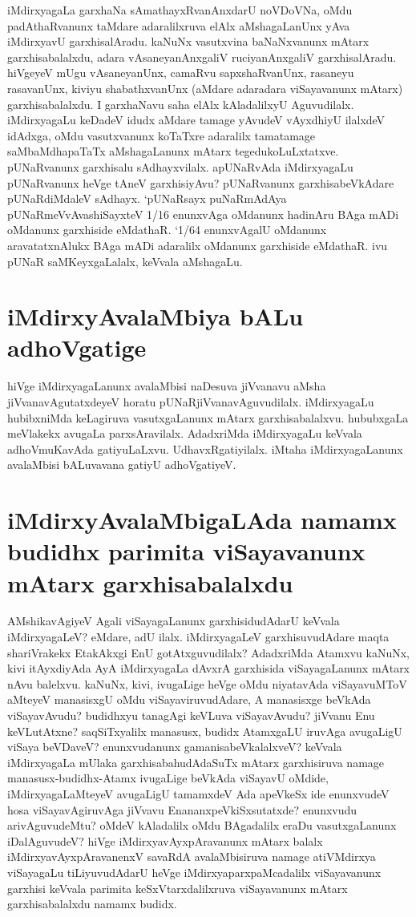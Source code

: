 iMdirxyagaLa garxhaNa sAmathayxRvanAnxdarU noVDoVNa, oMdu padAthaRvanunx taMdare adaralilxruva elAlx aMshagaLanUnx yAva iMdirxyavU garxhisalAradu. kaNuNx vasutxvina baNaNxvanunx mAtarx garxhisabalalxdu, adara vAsaneyanAnxgaliV ruciyanAnxgaliV garxhisalAradu. hiVgeyeV mUgu vAsaneyanUnx, camaRvu sapxshaRvanUnx, rasaneyu rasavanUnx, kiviyu shabathxvanUnx (aMdare adaradara viSayavanunx mAtarx) garxhisabalalxdu. I garxhaNavu saha elAlx kAladalilxyU Aguvudilalx. iMdirxyagaLu keDadeV idudx aMdare tamage yAvudeV vAyxdhiyU ilalxdeV idAdxga, oMdu vasutxvanunx koTaTxre adaralilx tamatamage saMbaMdhapaTaTx aMshagaLanunx mAtarx tegedukoLuLxtatxve. pUNaRvanunx garxhisalu sAdhayxvilalx. apUNaRvAda iMdirxyagaLu pUNaRvanunx heVge tAneV garxhisiyAvu? pUNaRvanunx garxhisabeVkAdare pUNaRdiMdaleV sAdhayx. `pUNaRsayx puNaRmAdAya\label{268} pUNaRmeVvAvashiSayxteV 1/16 enunxvAga oMdanunx hadinAru BAga mADi oMdanunx garxhiside eMdathaR. `1/64 enunxvAgalU oMdanunx aravatatxnAlukx BAga mADi adaralilx oMdanunx garxhiside eMdathaR. ivu pUNaR saMKeyxgaLalalx, keVvala aMshagaLu.

\section*{iMdirxyAvalaMbiya bALu adhoVgatige}

hiVge iMdirxyagaLanunx avalaMbisi naDesuva jiVvanavu aMsha jiVvanavAgutatxdeyeV horatu pUNaRjiVvanavAguvudilalx. iMdirxyagaLu hubibxniMda keLagiruva vasutxgaLanunx mAtarx garxhisabalalxvu. hububxgaLa meVlakekx avugaLa parxsAravilalx. AdadxriMda iMdirxyagaLu keVvala adhoVmuKavAda gatiyuLaLxvu. UdhavxRgatiyilalx. iMtaha iMdirxyagaLanunx avalaMbisi bALuvavana gatiyU adhoVgatiyeV.

\section*{iMdirxyAvalaMbigaLAda namamx budidhx parimita viSayavanunx mAtarx garxhisabalalxdu}

AMshikavAgiyeV Agali viSayagaLanunx garxhisidudAdarU keVvala iMdirxyagaLeV? eMdare, adU ilalx. iMdirxyagaLeV garxhisuvudAdare maqta shariVrakekx EtakAkxgi EnU gotAtxguvudilalx? AdadxriMda Atamxvu kaNuNx, kivi itAyxdiyAda AyA iMdirxyagaLa dAvxrA garxhisida viSayagaLanunx mAtarx nAvu balelxvu. kaNuNx, kivi, ivugaLige heVge oMdu niyatavAda viSayavuMToV aMteyeV manasisxgU oMdu viSayaviruvudAdare, A manasisxge beVkAda viSayavAvudu? budidhxyu tanagAgi keVLuva viSayavAvudu? jiVvanu Enu keVLutAtxne? saqSiTxyalilx manasusx, budidx AtamxgaLU iruvAga avugaLigU viSaya beVDaveV? enunxvudanunx gamanisabeVkalalxveV? keVvala iMdirxyagaLa mUlaka garxhisabahudAdaSuTx  mAtarx garxhisiruva namage manasusx-budidhx-Atamx ivugaLige beVkAda viSayavU oMdide, iMdirxyagaLaMteyeV avugaLigU tamamxdeV Ada apeVkeSx ide enunxvudeV hosa viSayavAgiruvAga jiVvavu EnananxpeVkiSxsutatxde? enunxvudu arivAguvudeMtu? oMdeV kAladalilx oMdu BAgadalilx eraDu vasutxgaLanunx iDalAguvudeV? hiVge iMdirxyavAyxpAravanunx mAtarx balalx iMdirxyavAyxpAravanenxV savaRdA avalaMbisiruva namage atiVMdirxya viSayagaLu tiLiyuvudAdarU heVge iMdirxyaparxpaMcadalilx viSayavanunx garxhisi keVvala parimita keSxVtarxdalilxruva viSayavanunx mAtarx garxhisabalalxdu namamx budidx.

